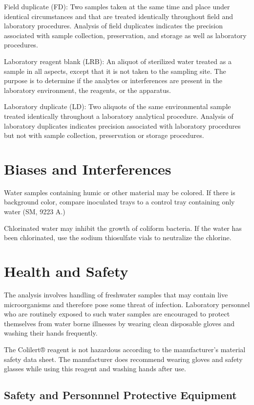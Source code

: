 \documentclass[12pt]{../SOP4_alpha}\usepackage[]{graphicx}\usepackage[]{xcolor}
\begin{document}
\NP Field duplicate (FD): Two samples taken at the same time and place under
identical circumstances and that are treated identically throughout field
and laboratory procedures. Analysis of field duplicates indicates the
precision associated with sample collection, preservation, and storage as
well as laboratory procedures.

\NP Laboratory reagent blank (LRB): An aliquot of sterilized water treated as a
sample in all aspects, except that it is not taken to the sampling site. The
purpose is to determine if the analytes or interferences are present in the
laboratory environment, the reagents, or the apparatus.

\NP Laboratory duplicate (LD): Two aliquots of the same environmental sample
treated identically throughout a laboratory analytical procedure. Analysis
of laboratory duplicates indicates precision associated with laboratory
procedures but not with sample collection, preservation or storage
procedures. 


\section{Biases and Interferences}
\NP Water samples containing humic or other material may be colored. If there is
background color, compare inoculated trays to a control tray containing only
water (SM, 9223 A.) 

\NP Chlorinated water may inhibit the growth of coliform bacteria. If the water has been 
chlorinated, use the sodium thiosulfate vials to neutralize the chlorine.

\section{Health and Safety}

\NP The analysis involves handling of freshwater samples that may contain live
microorganisms and therefore pose some threat of infection. Laboratory personnel
who are routinely exposed to such water samples are encouraged to protect
themselves from water borne illnesses by wearing clean disposable gloves and
washing their hands frequently.

\NP The Colilert® reagent is not hazardous according to the manufacturer’s material
safety data sheet. The manufacturer does recommend wearing gloves and safety
glasses while using this reagent and washing hands after use. 


\subsection{Safety and Personnnel Protective Equipment}
\end{document}

